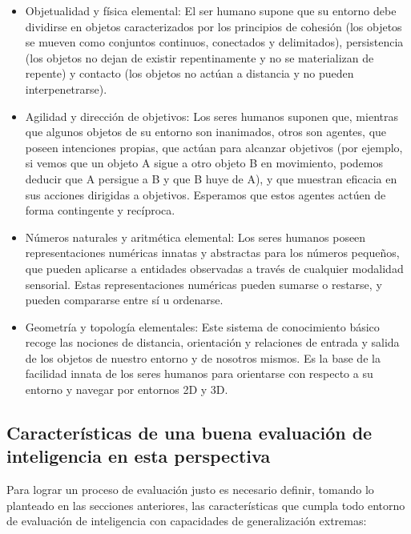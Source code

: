 \begin{itemize}

\item Objetualidad y física elemental: El ser humano supone que su entorno debe dividirse en objetos caracterizados por los principios de cohesión (los objetos se mueven como conjuntos continuos, conectados y delimitados), persistencia (los objetos no dejan de existir repentinamente y no se materializan de repente) y contacto (los objetos no actúan a distancia y no pueden interpenetrarse).

\item Agilidad y dirección de objetivos: Los seres humanos suponen que, mientras que algunos objetos de su entorno son inanimados, otros son agentes, que poseen intenciones propias, que actúan para alcanzar objetivos (por ejemplo, si vemos que un objeto A sigue a otro objeto B en movimiento, podemos deducir que A persigue a B y que B huye de A), y que muestran eficacia en sus acciones dirigidas a objetivos. Esperamos que estos agentes actúen de forma contingente y recíproca.

\item Números naturales y aritmética elemental: Los seres humanos poseen representaciones numéricas innatas y abstractas para los números pequeños, que pueden aplicarse a entidades observadas a través de cualquier modalidad sensorial. Estas representaciones numéricas pueden sumarse o restarse, y pueden compararse entre sí u ordenarse.

\item Geometría y topología elementales: Este sistema de conocimiento básico recoge las nociones de distancia, orientación y relaciones de entrada y salida de los objetos de nuestro entorno y de nosotros mismos. Es la base de la facilidad innata de los seres humanos para orientarse con respecto a su entorno y navegar por entornos 2D y 3D.
\end{itemize}

\subsection{Características de una buena evaluación de inteligencia en esta perspectiva}

Para lograr un proceso de evaluación justo es necesario definir, tomando lo planteado en las secciones anteriores, las características que cumpla todo entorno de evaluación de inteligencia con capacidades de generalización extremas:

